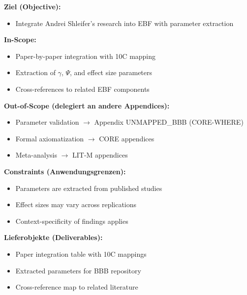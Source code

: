 
\begin{tcolorbox}[
    colback=orange!5!white,
    colframe=orange!75!black,
    title={\textbf{Appendix Scope: Ziel / In-Scope / Out-of-Scope / Constraints}},
    fonttitle=\bfseries
]

\textbf{Ziel (Objective):}
\begin{itemize}[nosep]
    \item Integrate Andrei Shleifer's research into EBF with parameter extraction
\end{itemize}

\textbf{In-Scope:}
\begin{itemize}[nosep]
    \item Paper-by-paper integration with 10C mapping
    \item Extraction of $\gamma$, $\Psi$, and effect size parameters
    \item Cross-references to related EBF components
\end{itemize}

\textbf{Out-of-Scope (delegiert an andere Appendices):}
\begin{itemize}[nosep]
    \item Parameter validation $\rightarrow$ Appendix UNMAPPED_BBB (CORE-WHERE)
    \item Formal axiomatization $\rightarrow$ CORE appendices
    \item Meta-analysis $\rightarrow$ LIT-M appendices
\end{itemize}

\textbf{Constraints (Anwendungsgrenzen):}
\begin{itemize}[nosep]
    \item Parameters are extracted from published studies
    \item Effect sizes may vary across replications
    \item Context-specificity of findings applies
\end{itemize}

\textbf{Lieferobjekte (Deliverables):}
\begin{itemize}[nosep]
    \item Paper integration table with 10C mappings
    \item Extracted parameters for BBB repository
    \item Cross-reference map to related literature
\end{itemize}

\end{tcolorbox}

